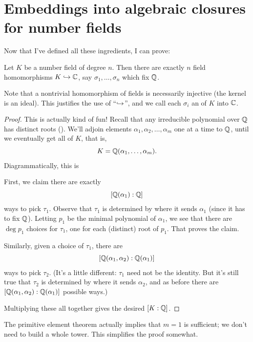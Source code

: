 \section{Embeddings into algebraic closures for number fields}
Now that I've defined all these ingredients, I can prove:
\begin{theorem}
	\label{thm:n_embeddings}
	Let $K$ be a number field of degree $n$.
	Then there are exactly $n$ field homomorphisms $K \hookrightarrow \mathbb C$,
	say $\sigma_1, \dots, \sigma_n$ which fix $\mathbb Q$.
\end{theorem}
\begin{remark}
	Note that a nontrivial homomorphism of fields is necessarily injective
	(the kernel is an ideal).
	This justifies the use of ``$\hookrightarrow$'', and we call each $\sigma_i$ an
	 of $K$ into $\mathbb C$.
\end{remark}
\begin{proof}
	This is actually kind of fun!
	Recall that any irreducible polynomial over $\mathbb Q$ has distinct roots ().
	We'll adjoin elements $\alpha_1, \alpha_2, \dots, \alpha_m$ one at a time to $\mathbb Q$,
	until we eventually get all of $K$, that is,
	\[ K = \mathbb Q(\alpha_1, \dots, \alpha_m). \]
	Diagrammatically, this is
	\begin{center}
	\end{center}
	First, we claim there are exactly \[ [\mathbb Q(\alpha_1) : \mathbb Q] \] ways to pick $\tau_1$.
	Observe that $\tau_1$ is determined by where it sends $\alpha_1$ (since it has to fix $\mathbb Q$).
	Letting $p_1$ be the minimal polynomial of $\alpha_1$, we see that there are $\deg p_1$ choices for $\tau_1$,
	one for each (distinct) root of $p_1$. That proves the claim.

	Similarly, given a choice of $\tau_1$, there are
	\[ [\mathbb Q(\alpha_1, \alpha_2) : \mathbb Q(\alpha_1)] \]
	ways to pick $\tau_2$.
	(It's a little different: $\tau_1$ need not be the identity.
	But it's still true that $\tau_2$ is determined by where it sends $\alpha_2$,
	and as before there are $[\mathbb Q(\alpha_1, \alpha_2) : \mathbb Q(\alpha_1)]$ possible ways.)

	Multiplying these all together gives the desired $[K:\mathbb Q]$.
\end{proof}
\begin{remark}
	The primitive element theorem actually implies that $m = 1$
	is sufficient; we don't need to build a whole tower.
	This simplifies the proof somewhat.
\end{remark}

